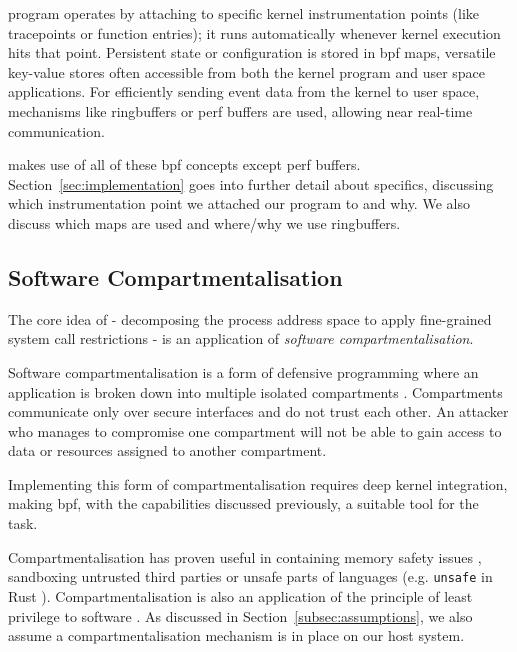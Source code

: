  program operates by attaching to specific kernel instrumentation
points (like tracepoints or function entries); it runs automatically
whenever kernel execution hits that point. Persistent state or configuration
is stored in \ac{bpf} maps, versatile key-value stores often accessible from both
the kernel program and user space applications. For efficiently sending
event data from the kernel to user space, mechanisms like ringbuffers or
perf buffers are used, allowing near real-time communication.

\af makes use of all of these \ac{bpf} concepts except perf buffers.
Section~\ref{sec:implementation} goes into further detail about specifics,
discussing which instrumentation point we attached our program to and why. We
also discuss which maps are used and where/why we use ringbuffers.

\subsection{Software Compartmentalisation}

The core idea of \af{}- decomposing the process address space to apply 
fine-grained system call restrictions - is an application of \textit{software
compartmentalisation}.

Software compartmentalisation is a form of defensive programming where an application
is broken down into multiple isolated compartments \cite{SOK}. Compartments
communicate only over secure interfaces and do not trust each other. An
attacker who manages to compromise one compartment will not be able to gain
access to data or resources assigned to another compartment.  

Implementing this form of compartmentalisation requires deep kernel
integration, making \ac{bpf}, with the capabilities discussed previously, a 
suitable tool for the task.  

Compartmentalisation has proven useful in containing memory safety issues
\cite{CONFFUZZ}, sandboxing untrusted third parties \cite{ANDROID_SOK} or
unsafe parts of languages \cite{MPK} (e.g. \texttt{unsafe} in Rust 
\cite{rustbook_unsafe}). Compartmentalisation is also an application of the
principle of least privilege to software \cite{PRIVMAN}. As discussed in 
Section~\ref{subsec:assumptions}, we also assume a compartmentalisation
mechanism is in place on our host system.
